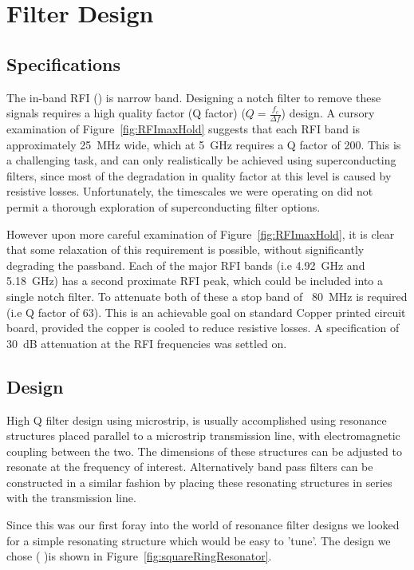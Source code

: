 \section{Filter Design}
\label{sec:filterDesign}
\subsection{Specifications}
The in-band RFI () is narrow band. Designing a notch filter to remove these signals requires a high quality factor (Q factor) ($Q=\frac{f_{c}}{\Delta f}$) design. A cursory examination of Figure~\ref{fig:RFImaxHold} suggests that each RFI band is approximately 25~MHz wide, which at 5~GHz requires a Q factor of 200. This is a challenging task, and can only realistically be achieved using superconducting filters, since most of the degradation in quality factor at this level is caused by resistive losses. Unfortunately, the timescales we were operating on did not permit a thorough exploration of superconducting filter options.

However upon more careful examination of Figure~\ref{fig:RFImaxHold}, it is clear that some relaxation of this requirement is possible, without significantly degrading the passband. Each of the major RFI bands (i.e 4.92~GHz and 5.18~GHz) has a second proximate RFI peak, which could be included into a single notch filter. To attenuate both of these a stop band of ~80~MHz is required (i.e Q factor of 63). This is an achievable goal on standard Copper printed circuit board, provided the copper is cooled to reduce resistive losses. A specification of 30~dB attenuation at the RFI frequencies was settled on.

\subsection{Design}

High Q filter design using microstrip, is usually accomplished using resonance structures placed parallel to a microstrip transmission line, with electromagnetic coupling between the two. The dimensions of these structures can be adjusted to resonate at the frequency of interest. Alternatively band pass filters can be constructed in a similar fashion by placing these resonating structures in series with the transmission line.

Since this was our first foray into the world of resonance filter designs we looked for a simple resonating structure which would be easy to 'tune'. The design we chose (\cite{splitRingClassic} )is shown in Figure~\ref{fig:squareRingResonator}.

